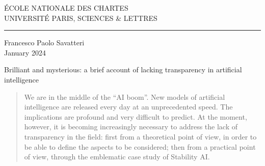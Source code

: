 
		\begin{center}
			
			\bigskip
			
			\begin{large}				
				ÉCOLE NATIONALE DES CHARTES\\
				UNIVERSITÉ PARIS, SCIENCES \& LETTRES
			\end{large}
			\begin{center}\rule{2cm}{0.02cm}\end{center}
			
			\bigskip
			\bigskip
			\bigskip
			\begin{large}
				Francesco Paolo Savatteri\\
				\vspace{1.3\baselineskip}
				January 2024
			\end{large}
			
			\vspace{4\baselineskip}
			
			\begin{Large}
				Brilliant and mysterious: a brief account of lacking transparency in artificial intelligence
			\end{Large}
			
			\vspace{8\baselineskip}
			
			\begin{normalsize}
			\begin{abstract}
				We are in the middle of the “AI boom”. New models of artificial intelligence are released every day at an unprecedented speed. The implications are profound and very difficult to predict. At the moment, however, it is becoming increasingly necessary to address the lack of transparency in the field: first from a theoretical point of view, in order to be able to define the aspects to be considered; then from a practical point of view, through the emblematic case study of Stability AI.
			\end{abstract}
			
			\end{normalsize}
			\bigskip
			\bigskip
	
	
			\vfill
			
			
		\end{center}

	
	\thispagestyle{empty}	
	\cleardoublepage